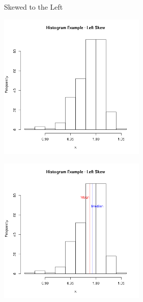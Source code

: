 \begin{frame}{Skewed to the Left}

  {
    \includegraphics[width=7cm]{img/leftSkew}
  }

  {
    \includegraphics[width=7cm]{img/leftSkewAnnotated}
  }

  
\end{frame}


